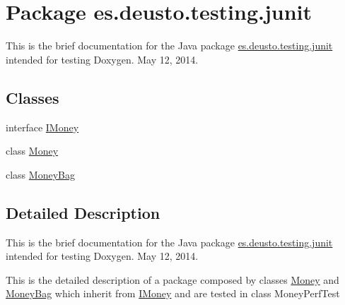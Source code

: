\hypertarget{namespacees_1_1deusto_1_1testing_1_1junit}{}\section{Package es.\+deusto.\+testing.\+junit}
\label{namespacees_1_1deusto_1_1testing_1_1junit}


This is the brief documentation for the Java package \mbox{\hyperlink{namespacees_1_1deusto_1_1testing_1_1junit}{es.\+deusto.\+testing.\+junit}} intended for testing Doxygen. May 12, 2014.  


\subsection*{Classes}
\begin{DoxyCompactItemize}
\item 
interface \mbox{\hyperlink{interfacees_1_1deusto_1_1testing_1_1junit_1_1_i_money}{I\+Money}}
\item 
class \mbox{\hyperlink{classes_1_1deusto_1_1testing_1_1junit_1_1_money}{Money}}
\item 
class \mbox{\hyperlink{classes_1_1deusto_1_1testing_1_1junit_1_1_money_bag}{Money\+Bag}}
\end{DoxyCompactItemize}


\subsection{Detailed Description}
This is the brief documentation for the Java package \mbox{\hyperlink{namespacees_1_1deusto_1_1testing_1_1junit}{es.\+deusto.\+testing.\+junit}} intended for testing Doxygen. May 12, 2014. 

This is the detailed description of a package composed by classes \mbox{\hyperlink{classes_1_1deusto_1_1testing_1_1junit_1_1_money}{Money}} and \mbox{\hyperlink{classes_1_1deusto_1_1testing_1_1junit_1_1_money_bag}{Money\+Bag}} which inherit from \mbox{\hyperlink{interfacees_1_1deusto_1_1testing_1_1junit_1_1_i_money}{I\+Money}} and are tested in class Money\+Perf\+Test 